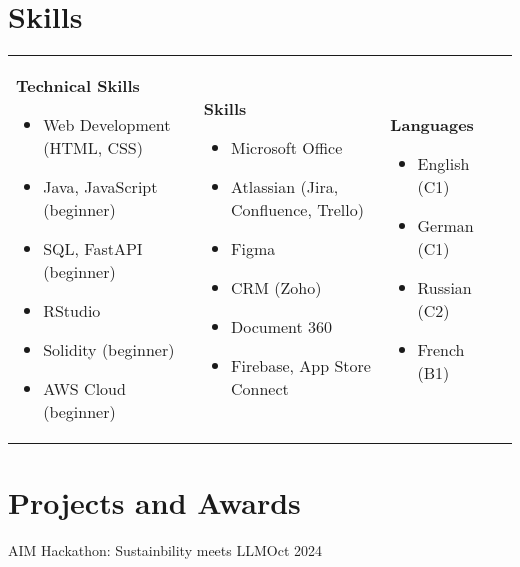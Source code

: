 \documentclass{ExpressiveResume}
\begin{document}
\section{Skills}
\noindent\begin{tabularx}{\textwidth}{@{}X@{}X@{}X@{}X@{}}
\textbf{Technical Skills}
\begin{itemize}
    \item Web Development (HTML, CSS)
    \item Java, JavaScript (beginner)
    \item SQL, FastAPI (beginner)
    \item RStudio
    \item Solidity (beginner)
    \item AWS Cloud (beginner)
\end{itemize}
&
\textbf{Skills}
\begin{itemize}
    \item Microsoft Office
    \item Atlassian (Jira, Confluence, Trello)
    \item Figma
    \item CRM (Zoho)
    \item Document 360
    \item Firebase, App Store Connect
\end{itemize}
&
\textbf{Languages}
\begin{itemize}
    \item English (C1)
    \item German (C1)
    \item Russian (C2)
    \item French (B1)
\end{itemize}
\end{tabularx}


\section{Projects and Awards}

{AIM Hackathon: Sustainbility meets LLM}{Oct 2024}{}
{
}
\end{document}
